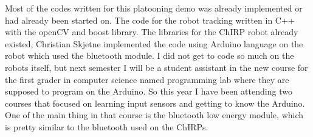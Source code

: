 Most of the codes written for this platooning demo was already implemented or had already been started on. The code for the robot tracking written in C++ with the openCV and boost library. The libraries for the ChIRP robot already existed, Christian Skjetne implemented the code using Arduino language on the robot which used the bluetooth module. 
I did not get to code so much on the robots itself, but next semester I will be a student assistant in the new course for the first grader in computer science named programming lab where they are supposed to program on the Arduino. So this year I have been attending two courses that focused on learning input sensors and getting to know the Arduino. One of the main thing in that course is the bluetooth low energy module, which is pretty similar to the bluetooth used on the ChIRPs. 
